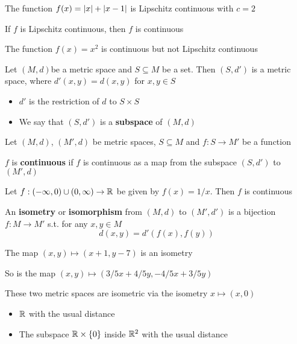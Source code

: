 \documentclass[11pt]{article}
\begin{document}
\begin{examplle}[In \(\R\)]
The function \(f(x)=\abs{x}+\abs{x-1}\) is Lipschitz continuous with \(c=2\)
\end{examplle}

\begin{proposition}[]
If \(f\) is Lipschitz continuous, then \(f\) is continuous
\end{proposition}

\begin{examplle}[]
The function \(f(x)=x^2\) is continuous but not Lipschitz continuous
\end{examplle}

\begin{definition}[]
Let \((M,d)\)be a metric space and \(S\subseteq M\) be a set. Then \((S,d')\) is a metric space,
where \(d'(x,y)=d(x,y)\) for \(x,y\in S\)
\begin{itemize}
\item \(d'\) is the restriction of \(d\) to \(S\times S\)
\item We say that \((S,d')\) is a \textbf{subspace} of \((M,d)\)
\end{itemize}
\end{definition}

Let \((M,d)\), \((M',d)\) be metric spaces, \(S\subseteq M\) and \(f:S\to M'\) be a function

\begin{definition}[]
\(f\)  is \textbf{continuous} if \(f\) is continuous as a map from the subspace \((S,d')\) to \((M',d)\)
\end{definition}

\begin{examplle}[in \(\R\)]
Let \(f:(-\infty,0)\cup(0,\infty)\to\mathbb{R}\)  be given by \(f(x)=1/x\). Then \(f\) is continuous
\end{examplle}

\begin{definition}[]
An \textbf{isometry} or \textbf{isomorphism} from \((M,d)\) to \((M',d')\) is a bijection \(f:M\to M'\) s.t. for
any \(x,y\in M\)
\begin{equation*}
d(x,y)=d'(f(x),f(y))
\end{equation*}
\end{definition}

\begin{examplle}[in \(\R^2\)]
The map \((x,y)\mapsto(x+1,y-7)\) is an isometry

So is the map \((x,y)\mapsto(3/5x+4/5y,-4/5x+3/5y)\)

These two metric spaces are isometric via the isometry \(x\mapsto(x,0)\)
\begin{itemize}
\item \(\R\) with the usual distance
\item The subspace \(\mathbb{R}\times\{0\}\) inside \(\R^2\) with the usual distance
\end{itemize}
\end{examplle}
\end{document}

